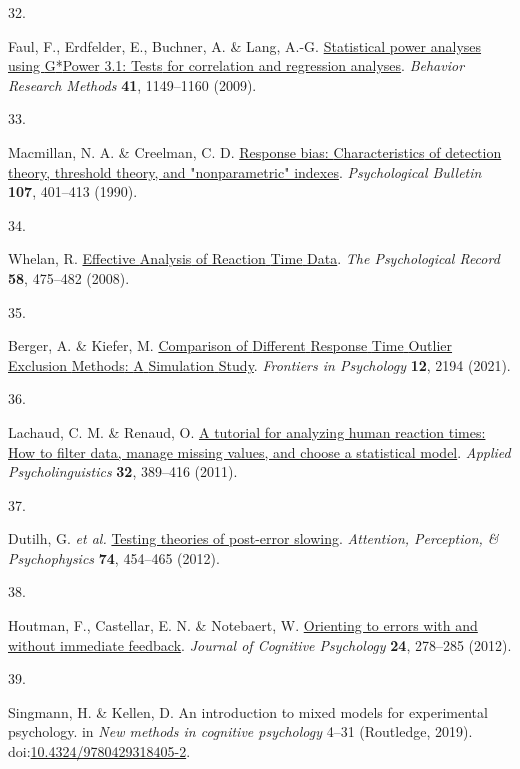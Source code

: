 \documentclass[
  man,floatsintext]{apa6}
\newlength{\cslhangindent}
\newlength{\csllabelwidth}
\newlength{\cslentryspacingunit} %
\newenvironment{CSLReferences}[2] %
 {%
  \setlength{\parindent}{0pt}
  \ifodd #1
  \let\oldpar\par
  \def\par{\hangindent=\cslhangindent\oldpar}
  \fi
  \setlength{\parskip}{#2\cslentryspacingunit}
 }%
 {}
\newcommand{\CSLLeftMargin}[1]{\parbox[t]{\csllabelwidth}{#1}}
\newcommand{\CSLRightInline}[1]{\parbox[t]{\linewidth - \csllabelwidth}{#1}\break}
\begin{document}
\begin{CSLReferences}{0}{0}
\leavevmode{}%
\CSLLeftMargin{32. }%
\CSLRightInline{Faul, F., Erdfelder, E., Buchner, A. \& Lang, A.-G. \href{https://doi.org/10.3758/BRM.41.4.1149}{Statistical power analyses using {G}*{Power} 3.1: {Tests} for correlation and regression analyses}. \emph{Behavior Research Methods} \textbf{41}, 1149--1160 (2009).}

\leavevmode{}%
\CSLLeftMargin{33. }%
\CSLRightInline{Macmillan, N. A. \& Creelman, C. D. \href{https://doi.org/10.1037/0033-2909.107.3.401}{Response bias: {Characteristics} of detection theory, threshold theory, and "nonparametric" indexes}. \emph{Psychological Bulletin} \textbf{107}, 401--413 (1990).}

\leavevmode{}%
\CSLLeftMargin{34. }%
\CSLRightInline{Whelan, R. \href{https://doi.org/10.1007/BF03395630}{Effective {Analysis} of {Reaction} {Time} {Data}}. \emph{The Psychological Record} \textbf{58}, 475--482 (2008).}

\leavevmode{}%
\CSLLeftMargin{35. }%
\CSLRightInline{Berger, A. \& Kiefer, M. \href{https://doi.org/10.3389/fpsyg.2021.675558}{Comparison of {Different} {Response} {Time} {Outlier} {Exclusion} {Methods}: {A} {Simulation} {Study}}. \emph{Frontiers in Psychology} \textbf{12}, 2194 (2021).}

\leavevmode{}%
\CSLLeftMargin{36. }%
\CSLRightInline{Lachaud, C. M. \& Renaud, O. \href{https://doi.org/10.1017/s0142716410000457}{A tutorial for analyzing human reaction times: {How} to filter data, manage missing values, and choose a statistical model}. \emph{Applied Psycholinguistics} \textbf{32}, 389--416 (2011).}

\leavevmode{}%
\CSLLeftMargin{37. }%
\CSLRightInline{Dutilh, G. \emph{et al.} \href{https://doi.org/10.3758/s13414-011-0243-2}{Testing theories of post-error slowing}. \emph{Attention, Perception, \& Psychophysics} \textbf{74}, 454--465 (2012).}

\leavevmode{}%
\CSLLeftMargin{38. }%
\CSLRightInline{Houtman, F., Castellar, E. N. \& Notebaert, W. \href{https://doi.org/10.1080/20445911.2011.617301}{Orienting to errors with and without immediate feedback}. \emph{Journal of Cognitive Psychology} \textbf{24}, 278--285 (2012).}

\leavevmode{}%
\CSLLeftMargin{39. }%
\CSLRightInline{Singmann, H. \& Kellen, D. An introduction to mixed models for experimental psychology. in \emph{New methods in cognitive psychology} 4--31 (Routledge, 2019). doi:\href{https://doi.org/10.4324/9780429318405-2}{10.4324/9780429318405-2}.}


\end{CSLReferences}
\end{document}
